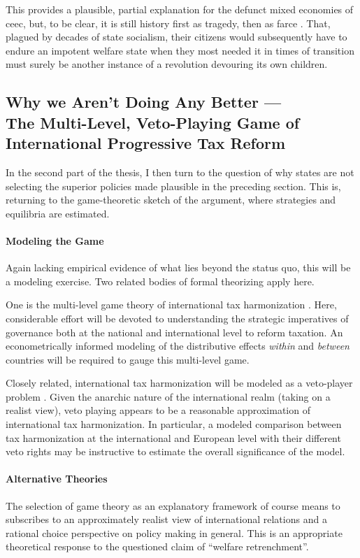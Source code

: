 This provides a plausible, partial explanation for the defunct mixed economies of \gls{ceec}, but, to be clear, it is still history first as tragedy, then as farce \citep{Marx1852}.
That, plagued by decades of state socialism, their citizens would subsequently have to endure an impotent welfare state when they most needed it in times of transition must surely be another instance of a revolution devouring its own children.

\subsection{Why we Aren't Doing Any Better ---\\The Multi-Level, Veto-Playing Game of International Progressive Tax Reform}

In the second part of the thesis, I then turn to the question of why states are not selecting the superior policies made plausible in the preceding section.
This is, returning to the game-theoretic sketch of the argument, where strategies and equilibria are estimated.

\paragraph{Modeling the Game}
Again lacking empirical evidence of what lies beyond the status quo, this will be a modeling exercise.
Two related bodies of formal theorizing apply here.

One is the multi-level game theory of international tax harmonization \citep{Scharpf-1997-aa}.
Here, considerable effort will be devoted to understanding the strategic imperatives of governance both at the national and international level to reform taxation.
An econometrically informed modeling of the distributive effects \emph{within} and \emph{between} countries will be required to gauge this multi-level game.

Closely related, international tax harmonization will be modeled as a veto-player problem \citep{Tsebelis-2002-aa}.
Given the anarchic nature of the international realm (taking on a realist view), veto playing appears to be a reasonable approximation of international tax harmonization.
In particular, a modeled comparison between tax harmonization at the international and European level with their different veto rights may be instructive to estimate the overall significance of the model.

\paragraph{Alternative Theories}
The selection of game theory as an explanatory framework of course means to subscribes to an approximately realist view of international relations and a rational choice perspective on policy making in general.
This is an appropriate theoretical response to the questioned claim of ``welfare retrenchment''.

